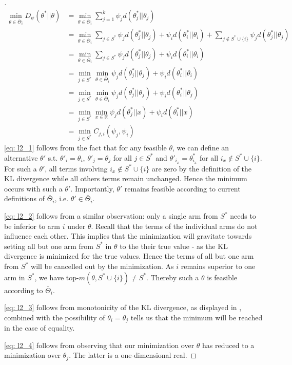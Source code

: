 \begin{proof}[]
  \begin{align}
    \min_{\theta \in \bar{\Theta}_i} D_\psi(\theta^*||\theta) &= \min_{\theta \in \bar{\Theta}_i} \sum_{j=1}^k \psi_j d(\theta^*_j||\theta_j)\\
    &= \min_{\theta \in \bar{\Theta}_i} \sum_{j\in S^*} \psi_{j}d(\theta^*_{j} || \theta_{j}) + \psi_{i}d(\theta_{i}^* || \theta_{i}) + \sum_{j \notin S^* \cup \{i\}} \psi_j d(\theta^*_j||\theta_j) \\
    &= \min_{\theta \in \bar{\Theta}_i} \sum_{j\in S^*} \psi_{j}d(\theta^*_{j} || \theta_{j}) + \psi_{i}d(\theta_{i}^* || \theta_{i}) \label{eq: l2_1}\\
    &= \min_{j\in S^*} \min_{\theta \in \bar{\Theta}_i} \psi_{j}d(\theta^*_{j} || \theta_{j}) + \psi_{i}d(\theta_{i}^* || \theta_{i}) \label{eq: l2_2}\\
    &= \min_{j\in S^*} \min_{\theta \in \bar{\Theta}_i} \psi_{j}d(\theta^*_{j} || \theta_{j}) + \psi_{i}d(\theta_{i}^* || \theta_{j}) \label{eq: l2_3}\\
    &= \min_{j\in S^*} \min_{x \in \mathbb{R}} \psi_{j}d(\theta^*_{j} || x) + \psi_{i}d(\theta_{i}^* ||x) \label{eq: l2_4}\\
    &= \min_{j \in S^*} C_{j, i}(\psi_j, \psi_i)
  \end{align}
  \eqref{eq: l2_1} follows from the fact that for any feasible $\theta$, we can define an alternative $\theta'$ s.t. $\theta'_i = \theta_i$, $\theta'_j = \theta_j$ for all $j \in S^*$ and $\theta'_{i_x} = \theta^*_{i_x}$ for all $i_x \notin S^* \cup \{i\}$. For such a $\theta'$, all terms involving $i_x \notin S^* \cup \{i\}$ are zero by the definition of the KL divergence while all others terms remain unchanged. Hence the minimum occurs with such a $\theta'$. Importantly, $\theta'$ remains feasible according to current definitions of $\bar{\Theta}_i$, i.e. $\theta' \in \bar{\Theta}_i$.

  \eqref{eq: l2_2} follows from a similar observation: only a single arm from $S^*$ needs to be inferior to arm $i$ under $\theta$. Recall that the terms of the individual arms do not influence each other. This implies that the minimization will gravitate towards setting all but one arm from $S^*$ in $\theta$ to the their true value - as the KL divergence is minimized for the true values. Hence the terms of all but one arm from $S^*$ will be cancelled out by the minimization. As $i$ remains superior to one arm in $S^*$, we have top-$m(\theta, S^* \cup \{i\}) \neq S^*$. Thereby such a $\theta$ is feasible according to $\bar{\Theta}_i$.

  \eqref{eq: l2_3} follows from monotonicity of the KL divergence, as displayed in , combined with the possibility of $\theta_i = \theta_j$ tells us that the minimum will be reached in the case of equality.

  \eqref{eq: l2_4} follows from observing that our minimization over $\theta$ has reduced to a minimization over $\theta_j$. The latter is a one-dimensional real.
\end{proof}

